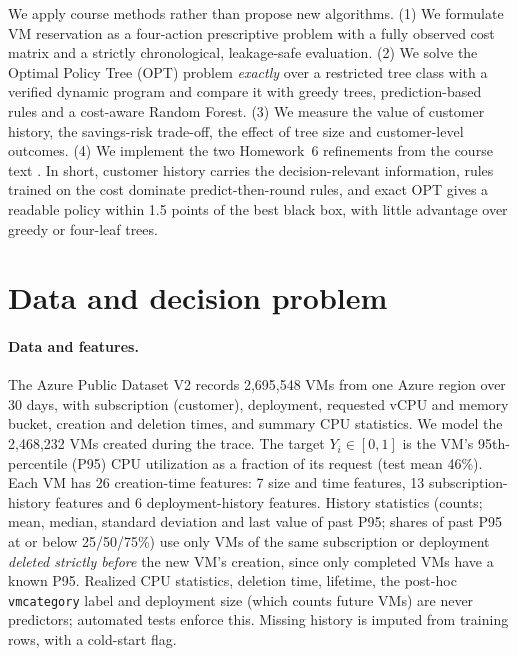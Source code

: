 \documentclass[10pt]{article}
\begin{document}
We apply course methods rather than propose new algorithms. (1) We formulate VM reservation as a four-action prescriptive problem with a fully observed cost matrix and a strictly chronological, leakage-safe evaluation. (2) We solve the Optimal Policy Tree (OPT) problem \citep{amram2022opt} \emph{exactly} over a restricted tree class with a verified dynamic program and compare it with greedy trees, prediction-based rules and a cost-aware Random Forest. (3) We measure the value of customer history, the savings-risk trade-off, the effect of tree size and customer-level outcomes. (4) We implement the two Homework~6 refinements from the course text \citep{bertsimas2019mlopt}. In short, customer history carries the decision-relevant information, rules trained on the cost dominate predict-then-round rules, and exact OPT gives a readable policy within 1.5 points of the best black box, with little advantage over greedy or four-leaf trees.

\section{Data and decision problem}
\label{sec:data}

\paragraph{Data and features.} The Azure Public Dataset V2 \citep{azuredataset} records 2,695,548 VMs from one Azure region over 30 days, with subscription (customer), deployment, requested vCPU and memory bucket, creation and deletion times, and summary CPU statistics. We model the 2,468,232 VMs created during the trace. The target $Y_i\in[0,1]$ is the VM's 95th-percentile (P95) CPU utilization as a fraction of its request (test mean 46\%). Each VM has 26 creation-time features: 7 size and time features, 13 subscription-history features and 6 deployment-history features. History statistics (counts; mean, median, standard deviation and last value of past P95; shares of past P95 at or below 25/50/75\%) use only VMs of the same subscription or deployment \emph{deleted strictly before} the new VM's creation, since only completed VMs have a known P95. Realized CPU statistics, deletion time, lifetime, the post-hoc \texttt{vmcategory} label and deployment size (which counts future VMs) are never predictors; automated tests enforce this. Missing history is imputed from training rows, with a cold-start flag.
\end{document}
